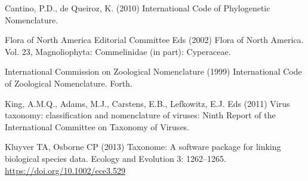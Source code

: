 \documentclass[
]{article}
\newlength{\cslhangindent}
\newlength{\cslentryspacingunit} %
\newenvironment{CSLReferences}[2] %
 {%
  \setlength{\parindent}{0pt}
  \ifodd #1
  \let\oldpar\par
  \def\par{\hangindent=\cslhangindent\oldpar}
  \fi
  \setlength{\parskip}{#2\cslentryspacingunit}
 }%
 {}
\begin{document}
\hypertarget{refs}{}
\begin{CSLReferences}{1}{0}
\leavevmode{}%
Cantino, P.D., de Queiroz, K. (2010) {International Code of Phylogenetic
Nomenclature}.

\leavevmode{}%
Flora of North America Editorial Committee Eds (2002) {Flora of North
America. Vol. 23, Magnoliophyta: Commelinidae (in part): Cyperaceae}.

\leavevmode{}%
International Commission on Zoological Nomenclature (1999)
{International Code of Zoological Nomenclature}. Forth.

\leavevmode{}%
King, A.M.Q., Adams, M.J., Carstens, E.B., Lefkowitz, E.J. Eds (2011)
{Virus taxonomy: classification and nomenclature of viruses: Ninth
Report of the International Committee on Taxonomy of Viruses.}

\leavevmode{}%
Kluyver TA, Osborne CP (2013) Taxonome: A software package for linking
biological species data. Ecology and Evolution 3: 1262--1265.
\url{https://doi.org/10.1002/ece3.529}

\end{CSLReferences}
\end{document}
